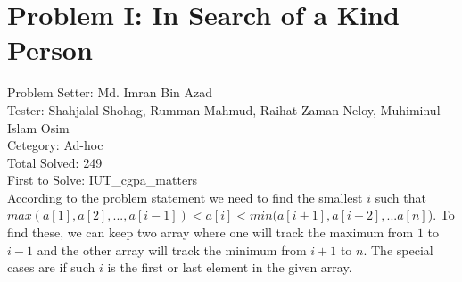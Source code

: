 \section*{Problem I: In Search of a Kind Person}
Problem Setter: Md. Imran Bin Azad \\
Tester: Shahjalal Shohag, Rumman Mahmud, Raihat Zaman Neloy, Muhiminul Islam Osim \\
Cetegory: Ad-hoc \\
Total Solved: 249 \\
First to Solve: IUT\_cgpa\_matters\\

According to the problem statement we need to find the smallest $i$ such that
$max(a[1], a[2], ... , a[i-1]) < a[i] < min(a[i+1], a[i+2], ... a[n]$). To find
these, we can keep two array where one will track the maximum from $1$ to $i-1$
and the other array will track the minimum from $i+1$ to $n$. The special cases
are if such $i$ is the first or last element in the given array.